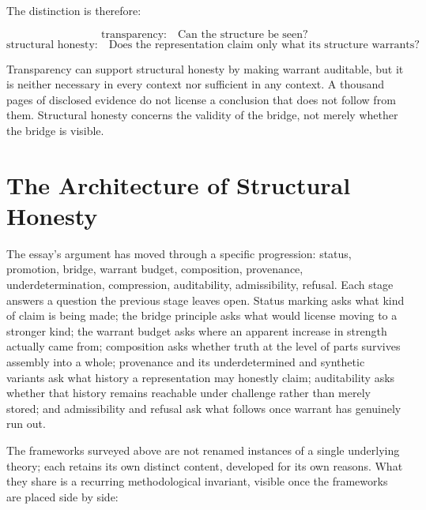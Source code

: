 \documentclass[11pt]{article}
\begin{document}
The distinction is therefore:

\[
\text{transparency}: \quad \text{Can the structure be seen?}
\]
\[
\text{structural honesty}: \quad
\text{Does the representation claim only what its structure warrants?}
\]

Transparency can support structural honesty by making warrant auditable, but it is neither necessary in every context nor sufficient in any context. A thousand pages of disclosed evidence do not license a conclusion that does not follow from them. Structural honesty concerns the validity of the bridge, not merely whether the bridge is visible.

\section{The Architecture of Structural Honesty}

The essay's argument has moved through a specific progression: status, promotion, bridge, warrant budget, composition, provenance, underdetermination, compression, auditability, admissibility, refusal. Each stage answers a question the previous stage leaves open. Status marking asks what kind of claim is being made; the bridge principle asks what would license moving to a stronger kind; the warrant budget asks where an apparent increase in strength actually came from; composition asks whether truth at the level of parts survives assembly into a whole; provenance and its underdetermined and synthetic variants ask what history a representation may honestly claim; auditability asks whether that history remains reachable under challenge rather than merely stored; and admissibility and refusal ask what follows once warrant has genuinely run out.

The frameworks surveyed above are not renamed instances of a single underlying theory; each retains its own distinct content, developed for its own reasons. What they share is a recurring methodological invariant, visible once the frameworks are placed side by side:
\end{document}

